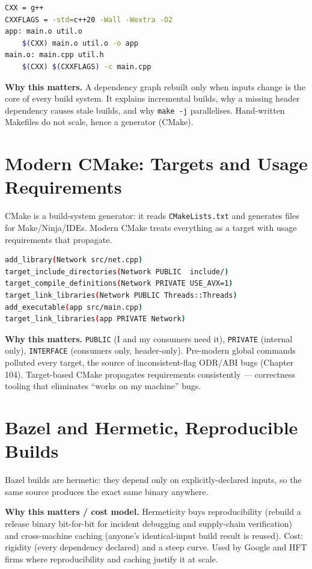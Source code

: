 \begin{lstlisting}[language=bash, caption={A Makefile's target/prerequisite/recipe model.}]
CXX = g++
CXXFLAGS = -std=c++20 -Wall -Wextra -O2
app: main.o util.o
	$(CXX) main.o util.o -o app
main.o: main.cpp util.h
	$(CXX) $(CXXFLAGS) -c main.cpp
\end{lstlisting}

\textbf{Why this matters.} A dependency graph rebuilt only when inputs change is the core of every build system. It explains incremental builds, why a missing header dependency causes stale builds, and why \texttt{make -j} parallelises. Hand-written Makefiles do not scale, hence a generator (CMake).

\section{Modern CMake: Targets and Usage Requirements}
CMake is a build-system generator: it reads \texttt{CMakeLists.txt} and generates files for Make/Ninja/IDEs. Modern CMake treats everything as a target with usage requirements that propagate.

\begin{lstlisting}[language=bash, caption={Modern CMake: usage requirements propagate transitively. Min: CMake 3.x.}]
add_library(Network src/net.cpp)
target_include_directories(Network PUBLIC  include/)
target_compile_definitions(Network PRIVATE USE_AVX=1)
target_link_libraries(Network PUBLIC Threads::Threads)
add_executable(app src/main.cpp)
target_link_libraries(app PRIVATE Network)
\end{lstlisting}

\textbf{Why this matters.} \texttt{PUBLIC} (I and my consumers need it), \texttt{PRIVATE} (internal only), \texttt{INTERFACE} (consumers only, header-only). Pre-modern global commands polluted every target, the source of inconsistent-flag ODR/ABI bugs (Chapter 104). Target-based CMake propagates requirements consistently --- correctness tooling that eliminates ``works on my machine'' bugs.

\section{Bazel and Hermetic, Reproducible Builds}
Bazel builds are hermetic: they depend only on explicitly-declared inputs, so the same source produces the exact same binary anywhere.

\textbf{Why this matters / cost model.} Hermeticity buys reproducibility (rebuild a release binary bit-for-bit for incident debugging and supply-chain verification) and cross-machine caching (anyone's identical-input build result is reused). Cost: rigidity (every dependency declared) and a steep curve. Used by Google and HFT firms where reproducibility and caching justify it at scale.

